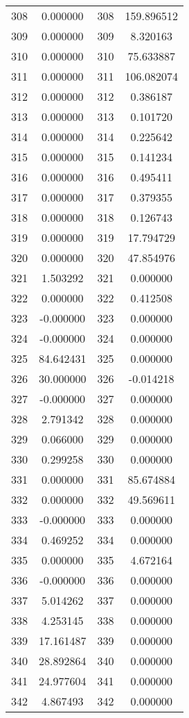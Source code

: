 \documentclass[12pt]{article}
\begin{document}
\begin{longtable}{@{}cccc@{}}
308 & 0.000000 & 308 & 159.896512 \\
309 & 0.000000 & 309 & 8.320163 \\
310 & 0.000000 & 310 & 75.633887 \\
311 & 0.000000 & 311 & 106.082074 \\
312 & 0.000000 & 312 & 0.386187 \\
313 & 0.000000 & 313 & 0.101720 \\
314 & 0.000000 & 314 & 0.225642 \\
315 & 0.000000 & 315 & 0.141234 \\
316 & 0.000000 & 316 & 0.495411 \\
317 & 0.000000 & 317 & 0.379355 \\
318 & 0.000000 & 318 & 0.126743 \\
319 & 0.000000 & 319 & 17.794729 \\
320 & 0.000000 & 320 & 47.854976 \\
321 & 1.503292 & 321 & 0.000000 \\
322 & 0.000000 & 322 & 0.412508 \\
323 & -0.000000 & 323 & 0.000000 \\
324 & -0.000000 & 324 & 0.000000 \\
325 & 84.642431 & 325 & 0.000000 \\
326 & 30.000000 & 326 & -0.014218 \\
327 & -0.000000 & 327 & 0.000000 \\
328 & 2.791342 & 328 & 0.000000 \\
329 & 0.066000 & 329 & 0.000000 \\
330 & 0.299258 & 330 & 0.000000 \\
331 & 0.000000 & 331 & 85.674884 \\
332 & 0.000000 & 332 & 49.569611 \\
333 & -0.000000 & 333 & 0.000000 \\
334 & 0.469252 & 334 & 0.000000 \\
335 & 0.000000 & 335 & 4.672164 \\
336 & -0.000000 & 336 & 0.000000 \\
337 & 5.014262 & 337 & 0.000000 \\
338 & 4.253145 & 338 & 0.000000 \\
339 & 17.161487 & 339 & 0.000000 \\
340 & 28.892864 & 340 & 0.000000 \\
341 & 24.977604 & 341 & 0.000000 \\
342 & 4.867493 & 342 & 0.000000 \\

\end{longtable}
\end{document}

